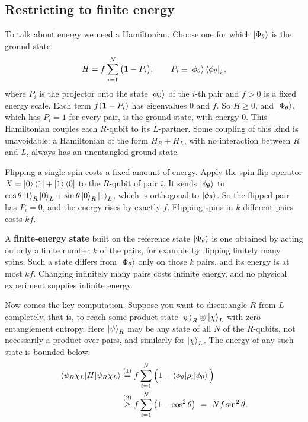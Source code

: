 \subsection*{Restricting to finite energy}

To talk about energy we need a Hamiltonian. Choose one for which $\ket{\Phi_\theta}$ is the ground state:
\[
H = f\sum_{i=1}^N \big(\mathbf{1} - P_i\big), \qquad P_i \equiv \ket{\phi_\theta}\bra{\phi_\theta}_i ,
\]
where $P_i$ is the projector onto the state $\ket{\phi_\theta}$ of the $i$-th pair and $f>0$ is a fixed energy
scale. Each term $f(\mathbf{1}-P_i)$ has eigenvalues $0$ and $f$. So $H\ge0$, and $\ket{\Phi_\theta}$, which has
$P_i=1$ for every pair, is the ground state, with energy $0$. This Hamiltonian couples each $R$-qubit to its
$L$-partner. Some coupling of this kind is unavoidable: a Hamiltonian of the form $H_R+H_L$, with no
interaction between $R$ and $L$, always has an unentangled ground state.

Flipping a single spin costs a fixed amount of energy. Apply the spin-flip operator
$X = \ket0\bra1 + \ket1\bra0$ to the $R$-qubit of pair $i$. It sends
$\ket{\phi_\theta}$ to $\cos\theta\ket1_R\ket0_L + \sin\theta\ket0_R\ket1_L$, which is orthogonal to
$\ket{\phi_\theta}$. So the flipped pair has $P_i=0$, and the energy rises by exactly $f$. Flipping spins in
$k$ different pairs costs $kf$.

A \textbf{finite-energy state} built on the reference state $\ket{\Phi_\theta}$ is one obtained by acting on
only a finite number $k$ of the pairs, for example by flipping finitely many spins. Such a state differs from
$\ket{\Phi_\theta}$ only on those $k$ pairs, and its energy is at most $kf$. Changing infinitely many pairs
costs infinite energy, and no physical experiment supplies infinite energy.

Now comes the key computation. Suppose you want to disentangle $R$ from $L$ completely, that is, to reach
some product state $\ket\psi_R\otimes\ket\chi_L$ with zero entanglement entropy. Here $\ket\psi_R$ may be any
state of all $N$ of the $R$-qubits, not necessarily a product over pairs, and similarly for $\ket\chi_L$.
The energy of any such state is bounded below:
\begin{align}
\braket{\psi_R\chi_L|H|\psi_R\chi_L}
&\overset{(1)}{=} f\sum_{i=1}^N\Big(1-\braket{\phi_\theta|\rho_i|\phi_\theta}\Big) \notag\\
&\overset{(2)}{\ge} f\sum_{i=1}^N\big(1-\cos^2\theta\big) \ =\ N f\sin^2\theta .
\label{eq:qubit_product_energy}
\end{align}
\quad
{}

